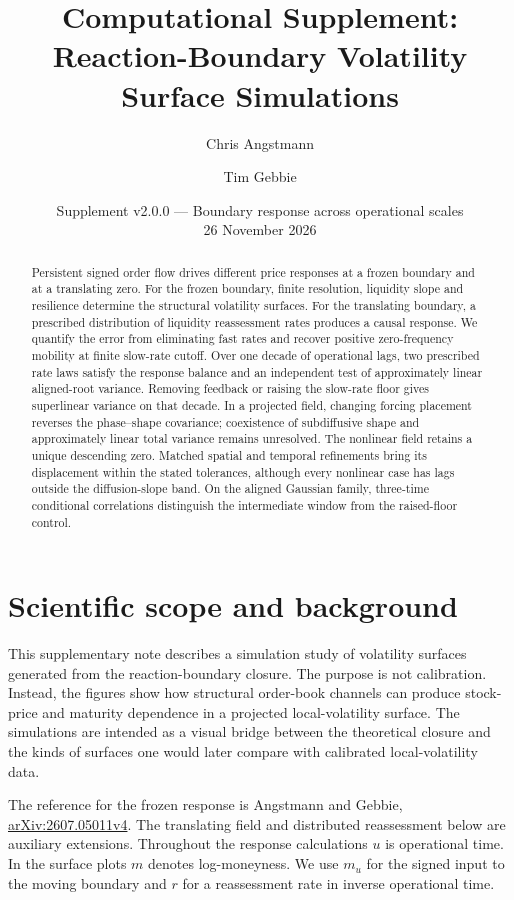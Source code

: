 \documentclass[11pt]{article}
\title{Computational Supplement:\\Reaction-Boundary Volatility Surface Simulations}
\author{Chris Angstmann \and Tim Gebbie}
\date{Supplement v2.0.0 --- Boundary response across operational scales\\26 November 2026}
\begin{document}
\maketitle

\begin{abstract}
Persistent signed order flow drives different price responses at a frozen boundary and at a translating zero. For the frozen boundary, finite resolution, liquidity slope and resilience determine the structural volatility surfaces. For the translating boundary, a prescribed distribution of liquidity reassessment rates produces a causal response. We quantify the error from eliminating fast rates and recover positive zero-frequency mobility at finite slow-rate cutoff. Over one decade of operational lags, two prescribed rate laws satisfy the response balance and an independent test of approximately linear aligned-root variance. Removing feedback or raising the slow-rate floor gives superlinear variance on that decade. In a projected field, changing forcing placement reverses the phase--shape covariance; coexistence of subdiffusive shape and approximately linear total variance remains unresolved. The nonlinear field retains a unique descending zero. Matched spatial and temporal refinements bring its displacement within the stated tolerances, although every nonlinear case has lags outside the diffusion-slope band. On the aligned Gaussian family, three-time conditional correlations distinguish the intermediate window from the raised-floor control.
\end{abstract}
\tableofcontents

\section{Scientific scope and background}

This supplementary note describes a simulation study of volatility surfaces
generated from the reaction-boundary closure. The purpose is not calibration.
Instead, the figures show how structural order-book channels can produce
stock-price and maturity dependence in a projected local-volatility surface.
The simulations are intended as a visual bridge between the theoretical
closure and the kinds of surfaces one would later compare with calibrated
local-volatility data.

The reference for the frozen response is Angstmann and Gebbie,
\href{https://arxiv.org/abs/2607.05011v4}{arXiv:2607.05011v4}.
The translating field and distributed reassessment below are auxiliary
extensions. Throughout the response calculations \(u\) is operational
time. In the surface plots \(m\) denotes log-moneyness. We use \(m_u\)
for the signed input to the moving boundary and \(r\) for a reassessment
rate in inverse operational time.
\end{document}
